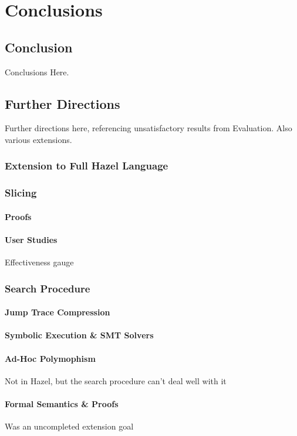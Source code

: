 \chapter{Conclusions}\label{chap:Conclusions}

\section{Conclusion}
Conclusions Here.

\section{Further Directions}
Further directions here, referencing unsatisfactory results from Evaluation. Also various extensions.
\subsection{Extension to Full Hazel Language}

\subsection{Slicing}
\subsubsection{Proofs}
\subsubsection{User Studies}
Effectiveness gauge

\subsection{Search Procedure}
\subsubsection{Jump Trace Compression}
\subsubsection{Symbolic Execution \& SMT Solvers}
\subsubsection{Ad-Hoc Polymophism}
Not in Hazel, but the search procedure can't deal well with it
\subsubsection{Formal Semantics \& Proofs}
Was an uncompleted extension goal

